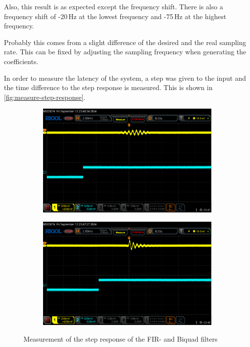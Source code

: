 Also, this result is as expected except the frequency shift. There is also a frequency shift of -20\,Hz at
the lowest frequency and -75\,Hz at the highest frequency.

Probably this comes from a slight difference of the desired and the real sampling rate. This can be
fixed by adjusting the sampling frequency when generating the coefficients.

In order to measure the latency of the system, a step was given to the input and the time difference to
the step response is measured. This is shown in \autoref{fig:measure-step-response}.

\begin{figure}[!h]
    \centering
    \begin{subfigure}[c]{0.49\textwidth}
        \centering
        \includegraphics[width=\textwidth]{img/step_response_2242_fir_hamming.png}
    \end{subfigure}
    \begin{subfigure}[c]{0.49\textwidth}
        \centering
        \includegraphics[width=\textwidth]{img/step_response_2300_iir.png}
    \end{subfigure}
    \caption{Measurement of the step response of the \ac{FIR}- and Biquad filters}
    \label{fig:measure-step-response}
\end{figure}

